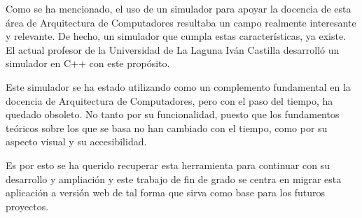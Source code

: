Como se ha mencionado, el uso de un simulador para apoyar la docencia de esta área
de Arquitectura de Computadores resultaba un campo realmente interesante y relevante. 
De hecho, un simulador que cumpla estas características, ya existe. El actual profesor 
de la Universidad de La Laguna Iván Castilla desarrolló un simulador en C++ con este propósito.

\bigskip
Este simulador se ha estado utilizando como un complemento fundamental en la docencia
de Arquitectura de Computadores, pero con el paso del tiempo, ha quedado obsoleto. 
No tanto por su funcionalidad, puesto que los fundamentos teóricos sobre los que 
se basa no han cambiado con el tiempo, como por su aspecto visual y su accesibilidad.

\bigskip
Es por esto se ha querido recuperar esta herramienta para continuar con su desarrollo 
y ampliación y este trabajo de fin de grado se centra en migrar esta aplicación a versión 
web de tal forma que sirva como base para los futuros proyectos.